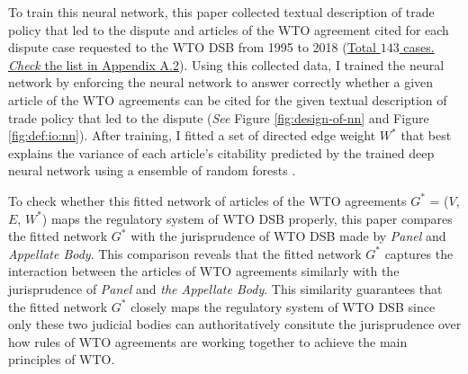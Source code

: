 
To train this neural network, this paper collected textual description of trade policy 
that led to the dispute and articles of the WTO agreement cited for each dispute
case requested to the WTO DSB 
from 1995 to 2018 (\hyperref[sub:cited-articles-table]{Total $143$ cases. \textit{Check} the list in Appendix A.2}).
Using this collected data, I trained the neural network by enforcing the neural network to answer correctly 
whether a given article of the WTO agreements
can be cited for the given textual description of 
trade policy that led to the dispute (\textit{See} Figure \ref{fig:design-of-nn} and Figure \ref{fig:def:io:nn}).
After training, I fitted a set of directed edge weight $W^*$ that 
best explains the variance of each article's citability predicted by the trained deep neural network using a ensemble of random forests \citep{genie3}. 


To check whether this fitted network of articles of the WTO agreements $G^*$ = ($V$, $E$, $W^*$) maps the regulatory system of WTO DSB properly, this paper
compares the fitted network $G^*$ with the jurisprudence of WTO DSB made by \textit{Panel} and \textit{Appellate Body}. 
This comparison reveals that the fitted network $G^*$ captures the interaction between the articles of WTO agreements
similarly with the jurisprudence of \textit{Panel} and \textit{the Appellate Body}. This similarity guarantees that the fitted network $G^*$ closely maps the regulatory system of WTO DSB since only these two judicial bodies 
can authoritatively consitute the jurisprudence over how rules of WTO agreements are working together 
to achieve the main principles of WTO.


